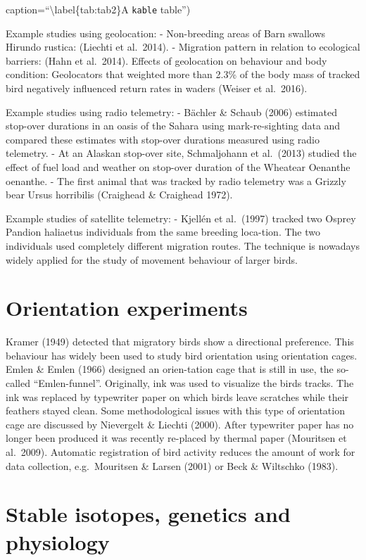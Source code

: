 \documentclass[
]{book}
\begin{document}
caption=``\textbackslash label\{tab:tab2\}A \texttt{kable} table'')

Example studies using geolocation:
- Non-breeding areas of Barn swallows Hirundo rustica: (Liechti et al.~2014).
- Migration pattern in relation to ecological barriers: (Hahn et al.~2014).
Effects of geolocation on behaviour and body condition: Geolocators that weighted more than 2.3\% of the body mass of tracked bird negatively influenced return rates in waders (Weiser et al.~2016).

Example studies using radio telemetry:
- Bächler \& Schaub (2006) estimated stop-over durations in an oasis of the Sahara using mark-re-sighting data and compared these estimates with stop-over durations measured using radio telemetry.
- At an Alaskan stop-over site, Schmaljohann et al.~(2013) studied the effect of fuel load and weather on stop-over duration of the Wheatear Oenanthe oenanthe.
- The first animal that was tracked by radio telemetry was a Grizzly bear Ursus horribilis (Craighead \& Craighead 1972).

Example studies of satellite telemetry:
- Kjellén et al.~(1997) tracked two Osprey Pandion haliaetus individuals from the same breeding loca-tion. The two individuals used completely different migration routes. The technique is nowadays widely applied for the study of movement behaviour of larger birds.

\hypertarget{orientation-experiments}{%
\section{Orientation experiments}\label{orientation-experiments}}

Kramer (1949) detected that migratory birds show a directional preference. This behaviour has widely been used to study bird orientation using orientation cages. Emlen \& Emlen (1966) designed an orien-tation cage that is still in use, the so-called ``Emlen-funnel''. Originally, ink was used to visualize the birds tracks. The ink was replaced by typewriter paper on which birds leave scratches while their feathers stayed clean. Some methodological issues with this type of orientation cage are discussed by Nievergelt \& Liechti (2000). After typewriter paper has no longer been produced it was recently re-placed by thermal paper (Mouritsen et al.~2009). Automatic registration of bird activity reduces the amount of work for data collection, e.g.~Mouritsen \& Larsen (2001) or Beck \& Wiltschko (1983).

\hypertarget{stable-isotopes-genetics-and-physiology}{%
\section{Stable isotopes, genetics and physiology}\label{stable-isotopes-genetics-and-physiology}}
\end{document}
